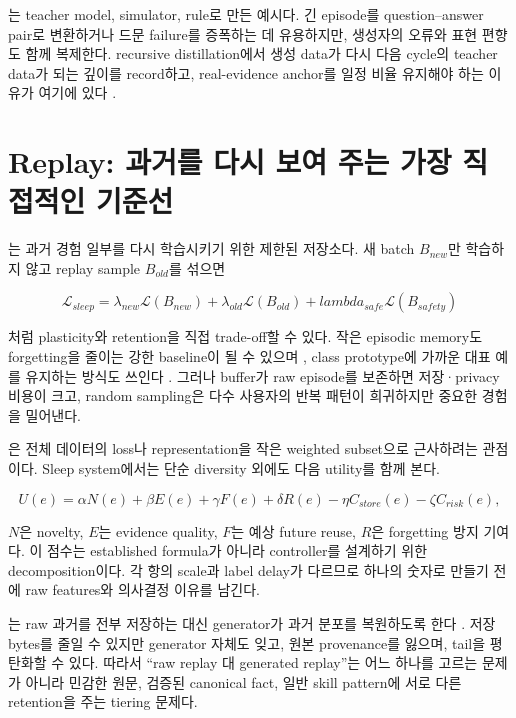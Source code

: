 는 teacher model, simulator, rule로 만든 예시다. 긴
episode를 question--answer pair로 변환하거나 드문 failure를 증폭하는 데 유용하지만, 생성자의
오류와 표현 편향도 함께 복제한다. recursive distillation에서 생성 data가 다시 다음 cycle의
teacher data가 되는 깊이를 record하고, real-evidence anchor를 일정 비율 유지해야 하는 이유가
여기에 있다 \parencite{shumailov2024collapse}.

\section{Replay: 과거를 다시 보여 주는 가장 직접적인 기준선}

는 과거 경험 일부를 다시 학습시키기 위한 제한된 저장소다.
새 batch $B_{new}$만 학습하지 않고 replay sample $B_{old}$를 섞으면

\begin{equation}
\mathcal{L}_{sleep}=\lambda_{new}\mathcal{L}(B_{new})+
\lambda_{old}\mathcal{L}(B_{old})+lambda_{safe}\mathcal{L}(B_{safety})
\end{equation}

처럼 plasticity와 retention을 직접 trade-off할 수 있다. 작은 episodic memory도 forgetting을
줄이는 강한 baseline이 될 수 있으며 \parencite{chaudhry2019tiny}, class prototype에 가까운
대표 예를 유지하는 방식도 쓰인다 \parencite{rebuffi2017icarl}. 그러나 buffer가 raw episode를
보존하면 저장·privacy 비용이 크고, random sampling은 다수 사용자의 반복 패턴이 희귀하지만
중요한 경험을 밀어낸다.

은 전체 데이터의 loss나 representation을 작은 weighted subset으로
근사하려는 관점이다. Sleep system에서는 단순 diversity 외에도 다음 utility를 함께 본다.

\begin{equation}
U(e)=\alpha N(e)+\beta E(e)+\gamma F(e)+\delta R(e)
-\eta C_{store}(e)-\zeta C_{risk}(e),
\end{equation}

$N$은 novelty, $E$는 evidence quality, $F$는 예상 future reuse, $R$은 forgetting 방지 기여다.
이 점수는 established formula가 아니라 controller를 설계하기 위한 decomposition이다. 각 항의
scale과 label delay가 다르므로 하나의 숫자로 만들기 전에 raw features와 의사결정 이유를 남긴다.

는 raw 과거를 전부 저장하는 대신 generator가 과거
분포를 복원하도록 한다 \parencite{shin2017dgr}. 저장 bytes를 줄일 수 있지만 generator 자체도
잊고, 원본 provenance를 잃으며, tail을 평탄화할 수 있다. 따라서 ``raw replay 대 generated
replay''는 어느 하나를 고르는 문제가 아니라 민감한 원문, 검증된 canonical fact, 일반 skill
pattern에 서로 다른 retention을 주는 tiering 문제다.

